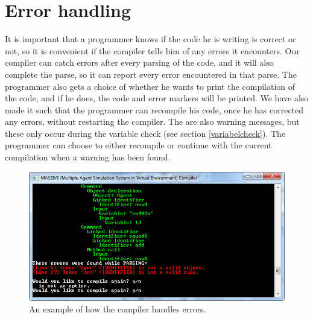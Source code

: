 \section{Error handling}
It is important that a programmer knows if the code he is writing is correct or not, so it is convenient if the compiler tells him of any errors it encounters. 
Our compiler can catch errors after every parsing of the code, and it will also complete the parse, so it can report every error encountered in that parse.\newline
The programmer also gets a choice of whether he wants to print the compilation of the code, and if he does, the code and error markers will be printed.
We have also made it such that the programmer can recompile his code, once he has corrected any errors, without restarting the compiler. \newline
The are also warning messages, but these only occur during the variable check (see section \ref{variabelcheck}). 
The programmer can choose to either recompile or continue with the current compilation when a warning has been found.

\begin{figure}[H]
\begin{center}
\includegraphics[scale=0.5]{Images/errorhandling.png}
\end{center}
\caption{An example of how the compiler handles errors.}
\end{figure}